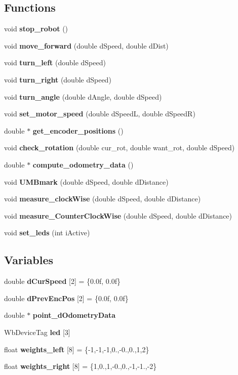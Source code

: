 \subsection*{Functions}
\begin{DoxyCompactItemize}
\item 
void {\bf stop\-\_\-robot} ()
\item 
void {\bf move\-\_\-forward} (double d\-Speed, double d\-Dist)
\item 
void {\bf turn\-\_\-left} (double d\-Speed)
\item 
void {\bf turn\-\_\-right} (double d\-Speed)
\item 
void {\bf turn\-\_\-angle} (double d\-Angle, double d\-Speed)
\item 
void {\bf set\-\_\-motor\-\_\-speed} (double d\-Speed\-L, double d\-Speed\-R)
\item 
double $\ast$ {\bf get\-\_\-encoder\-\_\-positions} ()
\item 
void {\bf check\-\_\-rotation} (double cur\-\_\-rot, double want\-\_\-rot, double d\-Speed)
\item 
double $\ast$ {\bf compute\-\_\-odometry\-\_\-data} ()
\item 
void {\bf U\-M\-Bmark} (double d\-Speed, double d\-Distance)
\item 
void {\bf measure\-\_\-clock\-Wise} (double d\-Speed, double d\-Distance)
\item 
void {\bf measure\-\_\-\-Counter\-Clock\-Wise} (double d\-Speed, double d\-Distance)
\item 
void {\bf set\-\_\-leds} (int i\-Active)
\end{DoxyCompactItemize}
\subsection*{Variables}
\begin{DoxyCompactItemize}
\item 
double {\bf d\-Cur\-Speed} [2] = \{0.\-0f, 0.\-0f\}
\item 
double {\bf d\-Prev\-Enc\-Pos} [2] = \{0.\-0f, 0.\-0f\}
\item 
double $\ast$ {\bf point\-\_\-d\-Odometry\-Data}
\item 
Wb\-Device\-Tag {\bf led} [3]
\item 
float {\bf weights\-\_\-left} [8] = \{-\/1,-\/1,-\/1,0.,-\/0.,0.,1,2\}
\item 
float {\bf weights\-\_\-right} [8] = \{1,0.,1,-\/0.,0.,-\/1,-\/1.,-\/2\}
\end{DoxyCompactItemize}


